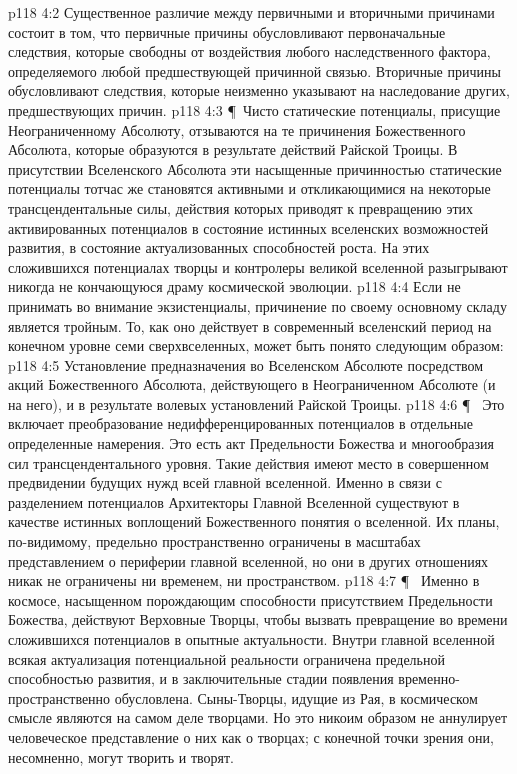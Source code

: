 \vs p118 4:2 Существенное различие между первичными и вторичными причинами состоит в том, что первичные причины обусловливают первоначальные следствия, которые свободны от воздействия любого наследственного фактора, определяемого любой предшествующей причинной связью. Вторичные причины обусловливают следствия, которые неизменно указывают на наследование других, предшествующих причин.
\vs p118 4:3 \P\ Чисто статические потенциалы, присущие Неограниченному Абсолюту, отзываются на те причинения Божественного Абсолюта, которые образуются в результате действий Райской Троицы. В присутствии Вселенского Абсолюта эти насыщенные причинностью статические потенциалы тотчас же становятся активными и откликающимися на некоторые трансцендентальные силы, действия которых приводят к превращению этих активированных потенциалов в состояние истинных вселенских возможностей развития, в состояние актуализованных способностей роста. На этих сложившихся потенциалах творцы и контролеры великой вселенной разыгрывают никогда не кончающуюся драму космической эволюции.
\vs p118 4:4 Если не принимать во внимание экзистенциалы, причинение по своему основному складу является тройным. То, как оно действует в современный вселенский период на конечном уровне семи сверхвселенных, может быть понято следующим образом:
\vs p118 4:5 \bibnobreakspace {} Установление предназначения во Вселенском Абсолюте посредством акций Божественного Абсолюта, действующего в Неограниченном Абсолюте (и на него), и в результате волевых установлений Райской Троицы.
\vs p118 4:6 \P\ \bibnobreakspace {} Это включает преобразование недифференцированных потенциалов в отдельные определенные намерения. Это есть акт Предельности Божества и многообразия сил трансцендентального уровня. Такие действия имеют место в совершенном предвидении будущих нужд всей главной вселенной. Именно в связи с разделением потенциалов Архитекторы Главной Вселенной существуют в качестве истинных воплощений Божественного понятия о вселенной. Их планы, по\hyp{}видимому, предельно пространственно ограничены в масштабах представлением о периферии главной вселенной, но  они в других отношениях никак не ограничены ни временем, ни пространством.
\vs p118 4:7 \P\ \bibnobreakspace {} Именно в космосе, насыщенном порождающим способности присутствием Предельности Божества, действуют Верховные Творцы, чтобы вызвать превращение во времени сложившихся потенциалов в опытные актуальности. Внутри главной вселенной всякая актуализация потенциальной реальности ограничена предельной способностью развития, и в заключительные стадии появления временно\hyp{}пространственно обусловлена. Сыны\hyp{}Творцы, идущие из Рая, в космическом смысле являются на самом деле  творцами. Но это никоим образом не аннулирует человеческое представление о них как о творцах; с конечной точки зрения они, несомненно, могут творить и творят.

